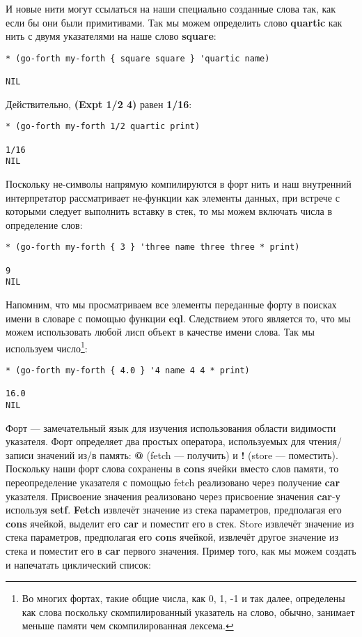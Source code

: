 И новые нити могут ссылаться на наши специально созданные слова так, как если бы они были примитивами. Так мы можем определить слово \textbf{quartic} как нить с двумя указателями на наше слово \textbf{square}:

\begin{verbatim}
* (go-forth my-forth { square square } 'quartic name)

NIL
\end{verbatim}

Действительно, \textbf{(Expt 1/2 4)} равен \textbf{1/16}:

\begin{verbatim}
* (go-forth my-forth 1/2 quartic print)

1/16
NIL
\end{verbatim}

Поскольку не-символы напрямую компилируются в форт нить и наш внутренний интерпретатор рассматривает  не-функции как элементы данных, при встрече с которыми следует выполнить вставку в стек, то мы можем включать числа в определение слов:

\begin{verbatim}
* (go-forth my-forth { 3 } 'three name three three * print)

9
NIL
\end{verbatim}

Напомним, что мы просматриваем все элементы переданные форту в поисках имени в словаре с помощью функции \textbf{eql}. Следствием этого является то, что мы можем использовать любой лисп объект в качестве имени слова. Так мы используем число\footnote{Во многих фортах, такие общие числа, как 0, 1, -1 и так далее, определены как слова поскольку скомпилированный указатель на слово, обычно, занимает меньше памяти чем скомпилированная лексема.}:

\begin{verbatim}
* (go-forth my-forth { 4.0 } '4 name 4 4 * print)

16.0
NIL
\end{verbatim}

Форт --- замечательный язык для изучения использования области видимости указателя. Форт определяет два простых оператора, используемых для чтения/записи значений из/в память: \textbf{@} (fetch --- получить) и \textbf{!} (store --- поместить). Поскольку наши форт слова сохранены в \textbf{cons} ячейки вместо слов памяти, то переопределение указателя с помощью fetch реализовано через получение \textbf{car} указателя. Присвоение значения реализовано через присвоение значения \textbf{car}-у используя \textbf{setf}. \textbf{Fetch} извлечёт значение из стека параметров, предполагая его \textbf{cons} ячейкой, выделит его \textbf{car} и поместит его в стек. Store извлечёт значение из стека параметров, предполагая его \textbf{cons} ячейкой, извлечёт другое значение из стека и поместит его в \textbf{car} первого значения. Пример того, как мы можем создать и напечатать циклический список:

